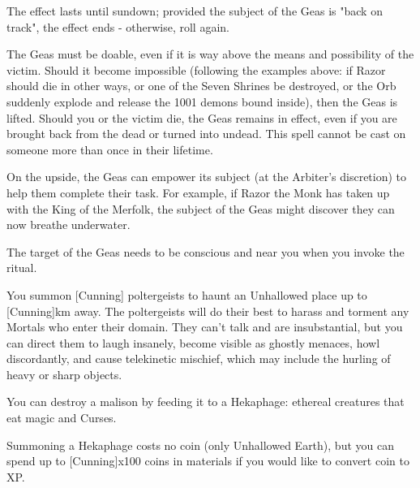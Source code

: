 {The effect lasts until sundown; provided the subject of the Geas is "back on track", the effect ends - otherwise, roll again.

The Geas must be doable, even if it is way above the means and possibility of the victim.  Should it become impossible (following the examples above: if Razor should die in other ways, or one of the Seven Shrines be destroyed, or the Orb suddenly explode and release the 1001 demons bound inside), then the Geas is lifted.  Should you or the victim die, the Geas remains in effect, even if you are brought back from the dead or turned into undead. This spell cannot be cast on someone more than once in their lifetime.

On the upside, the Geas can empower its subject (at the Arbiter's discretion) to help them complete their task.  For example, if Razor the Monk has taken up with the King of the Merfolk, the subject of the Geas might discover they can now breathe underwater.

The target of the Geas needs to be conscious and near you when you invoke the ritual.

\OCCULT[
  Name=Haunt,
  Link=occultism-haunt,
  Success=3+,
  Cost=666\FE
]


You summon [Cunning] poltergeists to haunt an Unhallowed place up to [Cunning]km away.  The poltergeists will do their best to harass and torment any Mortals who enter their domain. They can't talk and are insubstantial, but you can direct them to laugh insanely, become visible as ghostly menaces, howl discordantly, and cause telekinetic mischief, which may include the hurling of heavy or sharp objects.

\OCCULT[
  Name=Hekaphage,
  Link=occultism-hekaphage,
  Success=4+,
  Cost=varies
]

You can destroy a malison by feeding it to a Hekaphage: ethereal creatures that eat magic and Curses.  


Summoning a Hekaphage costs no coin (only Unhallowed Earth), but you can spend up to [Cunning]x100 coins in materials if you would like to convert coin to XP.

\cbreak

}
